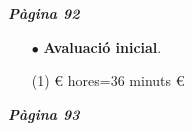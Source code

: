 \documentclass[a4paper, pdf, twoside]{book}
\begin{document}
\begin{multicols}{2}
{\textbf{\em Pàgina 92}} \hrulefill
\begin{enumerate}
\vspace{0.25cm}



 \item[$\bullet$ ] {\selectfont\color{blue}\textbf{Avaluació inicial}. } 
 \begin{tasks}[column-sep=1em, item-indent=1.3333em](1)
	  \euro {}
	  hores=36 minuts
	  \euro {}
\end{tasks}
 \end{enumerate}
\vspace{0.3cm}


{\textbf{\em Pàgina 93}} \hrulefill
\begin{enumerate}
\vspace{0.25cm}




\end{enumerate}
\end{multicols}
\end{document}
